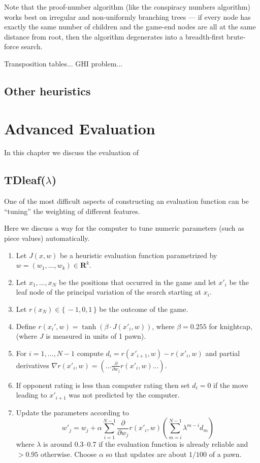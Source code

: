 \documentclass[10pt,dvipdfmx]{report}
\begin{document}
Note that the proof-number algorithm (like the conspiracy numbers algorithm) works best on irregular
and non-uniformly branching trees --- if every node has exactly the same number of children and the
game-end nodes are all at the same distance from root, then the algorithm degenerates into a breadth-first
brute-force search.  

Transposition tables... GHI problem...


\section{Other heuristics}

\chapter{Advanced Evaluation}
\label{chap-advanced-evaluation}

In this chapter we discuss the evaluation of

\section{TDleaf($\lambda$)}
One of the most difficult aspects of constructing an evaluation function
can be ``tuning'' the weighting of different features.

Here we discuss a way for the computer to tune numeric parameters
(such as piece values) automatically.

\begin{enumerate}
\item Let $J(x,w)$ be a heuristic evaluation function parametrized by
  $w=(w_1,\dots,w_k)\in\mathbf{R}^k$.
\item Let $x_1,\dots,x_N$ be the positions that occurred in the game and let
  $x'_i$ be the leaf node of the principal variation of the search starting
  at $x_i$.
\item Let $r(x_N)\in\{\,-1,0,1\,\}$ be the outcome of the game.
\item Define $r(x_i',w)=\tanh(\beta\cdot J(x'_i,w))$, where $\beta=0.255$ for
  knightcap, (where $J$ is measured in units of 1 pawn).
\item For $i=1,\dots,N-1$ compute $d_i = r(x'_{i+1},w) - r(x'_i,w)$ and partial
  derivatives $\nabla r(x'_i,w) = (\dots \frac{\partial}{\partial w_j}r(x'_i,w) \dots)$.
\item If opponent rating is less than computer rating then set $d_i=0$ if the move
  leading to $x'_{i+1}$ was not predicted by the computer.
\item Update the parameters according to 
  \[ w'_j = w_j + \alpha \sum_{i=1}^{N-1} \frac{\partial}{\partial w_j} r(x'_i,w)
    \left( \sum_{m=i}^{N-1}\lambda^{m-i}d_m \right) \]
  where $\lambda$ is around 0.3--0.7 if the evaluation function is already reliable
  and $>0.95$ otherwise.  Choose $\alpha$ so that updates are about $1/100$ of a pawn.
\end{enumerate}
\end{document}
